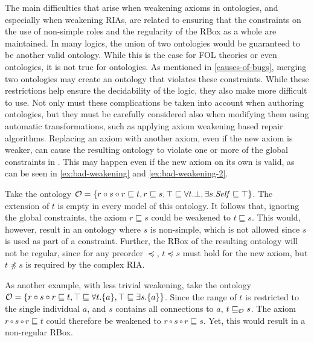 
The main difficulties that arise when weakening axioms in \SROIQ ontologies, and especially when weakening RIAs, are related to ensuring that the constraints on the use of non-simple roles and the regularity of the RBox as a whole are maintained. In many logics, the union of two ontologies would be guaranteed to be another valid ontology. While this is the case for FOL theories or even \ALC ontologies, it is not true for \SROIQ ontologies. As mentioned in \cref{causes-of-bugs}, merging two \SROIQ ontologies may create an ontology that violates these constraints. While these restrictions help ensure the decidability of the logic, they also make \SROIQ more difficult to use. Not only must these complications be taken into account when authoring ontologies, but they must be carefully considered also when modifying them using automatic transformations, such as applying axiom weakening based repair algorithms. Replacing an axiom with another axiom, even if the new axiom is weaker, can cause the resulting ontology to violate one or more of the global constraints in \SROIQ. This may happen even if the new axiom on its own is valid, as can be seen in \cref{ex:bad-weakening} and \cref{ex:bad-weakening-2}.

\begin{example} \label{ex:bad-weakening}
  Take the ontology $\mathcal{O} = \{ r \circ s \circ r \sqsubseteq t, r \sqsubseteq s, \top \sqsubseteq \forall t.\bot, \exists s.\mathit{Self} \sqsubseteq \top \}$. The extension of $t$ is empty in every model of this ontology. It follows that, ignoring the global constraints, the axiom $r \sqsubseteq s$ could be weakened to $t \sqsubseteq s$. This would, however, result in an ontology where $s$ is non-simple, which is not allowed since $s$ is used as part of a \self constraint.
  Further, the RBox of the resulting ontology will not be regular, since for any preorder $\preceq$, $t \preceq s$ must hold for the new axiom, but $t \not\preceq s$ is required by the complex RIA.
\end{example}

\begin{example} \label{ex:bad-weakening-2}
  As another example, with less trivial weakening, take the ontology $\mathcal{O} = \{ r \circ s \circ r \sqsubseteq t, \top \sqsubseteq \forall t.\{a\}, \top \sqsubseteq \exists s.\{a\} \}$. Since the range of $t$ is restricted to the single individual $a$, and $s$ contains all connections to $a$, $t \sqsubseteq_\mathcal{O} s$. The axiom $r \circ s \circ r \sqsubseteq t$ could therefore be weakened to $r \circ s \circ r \sqsubseteq s$. Yet, this would result in a non-regular RBox.
\end{example}

